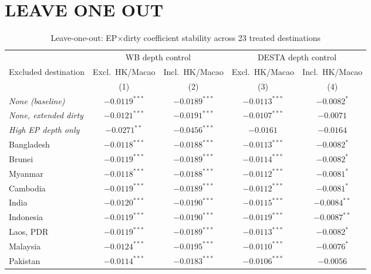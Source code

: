 \documentclass{article}
\begin{document}
\newpage
\section{LEAVE ONE OUT}

\begin{table}[htbp]
\centering
\footnotesize
\caption{Leave-one-out: EP$\times$dirty coefficient stability across 23 treated destinations}
\label{tab:loo_new}
\begin{threeparttable}
\begin{tabular}{lcccc}
\toprule
 & \multicolumn{2}{c}{WB depth control} & \multicolumn{2}{c}{DESTA depth control} \\
\cmidrule(lr){2-3}\cmidrule(lr){4-5}
Excluded destination & Excl.\ HK/Macao & Incl.\ HK/Macao & Excl.\ HK/Macao & Incl.\ HK/Macao \\
 & (1) & (2) & (3) & (4) \\
\midrule
\textit{None (baseline)}         & $-0.0119^{***}$ & $-0.0189^{***}$ & $-0.0113^{***}$ & $-0.0082^{*}$  \\
\textit{None, extended dirty}    & $-0.0121^{***}$ & $-0.0191^{***}$ & $-0.0107^{***}$ & $-0.0071$      \\
\midrule
\textit{High EP depth only}      & $-0.0271^{**}$  & $-0.0456^{***}$ & $-0.0161$       & $-0.0164$      \\
\midrule
Bangladesh     & $-0.0118^{***}$ & $-0.0188^{***}$ & $-0.0113^{***}$ & $-0.0082^{*}$  \\
Brunei         & $-0.0119^{***}$ & $-0.0189^{***}$ & $-0.0114^{***}$ & $-0.0082^{*}$  \\
Myanmar        & $-0.0118^{***}$ & $-0.0188^{***}$ & $-0.0112^{***}$ & $-0.0081^{*}$  \\
Cambodia       & $-0.0119^{***}$ & $-0.0189^{***}$ & $-0.0112^{***}$ & $-0.0081^{*}$  \\
India          & $-0.0120^{***}$ & $-0.0190^{***}$ & $-0.0115^{***}$ & $-0.0084^{**}$ \\
Indonesia      & $-0.0119^{***}$ & $-0.0190^{***}$ & $-0.0119^{***}$ & $-0.0087^{**}$ \\
Laos, PDR      & $-0.0119^{***}$ & $-0.0189^{***}$ & $-0.0113^{***}$ & $-0.0082^{*}$  \\
Malaysia       & $-0.0124^{***}$ & $-0.0195^{***}$ & $-0.0110^{***}$ & $-0.0076^{*}$  \\
Pakistan       & $-0.0114^{***}$ & $-0.0183^{***}$ & $-0.0106^{***}$ & $-0.0056$      \\

\end{tabular}
\end{threeparttable}
\end{table}
\end{document}
